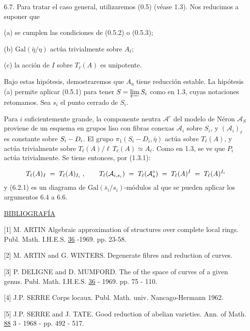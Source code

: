 6.7. Para tratar el caso general, utilizaremos (0.5) (véase 1.3). Nos reducimos a suponer que



(a) se cumplen las condiciones de (0.5.2) o (0.5.3);

(b) $\mathrm{Gal}(\bar{\eta}/\eta)$ actúa trivialmente sobre $A_\ell$;

(c) la acción de $I$ sobre $T_\ell(A)$ es unipotente.

Bajo estas hipótesis, demostraremos que $A_\eta$ tiene reducción estable. La hipótesis (a) permite aplicar (0.5.1) para tener $S = \varprojlim S_i$ como en 1.3, cuyas notaciones retomamos. Sea $s_i$ el punto cerrado de $S_i$.

Para $i$ suficientemente grande, la componente neutra $\mathcal{A}^\circ$ del modelo de Néron $\mathcal{A}_S$ proviene de un esquema en grupos liso con fibras conexas $\mathcal{A}_i$ sobre $S_i$, y $(\mathcal{A}_i)_\ell$ es constante sobre $S_i - \sisi{D}{D_i}$. El grupo $\pi_1(S_i - D_i , \bar{\eta})$ actúa sobre $T_\ell(A)$, y actúa trivialmente sobre $T_\ell(A)/\ell\, T_\ell(A) \simeq A_\ell$. Como en 1.3, se ve que $P_i$ actúa trivialmente. Se tiene entonces, por (1.3.1):

\begin{equation*}
T_\ell(A)_I \;=\; T_\ell(A)_{I_i} \;,\qquad T_\ell(\mathcal{A}_{i,s_i}) \;=\; T_\ell(\mathcal{A}^\circ_s) \;=\; T_\ell(A)^I \;=\; \sisi{T_\ell(A^{I_i})}{T_\ell(A)^{I_i}}
\end{equation*}
y (6.2.1) es un diagrama de $\mathrm{Gal}(\bar{s}_i/s_i)$-módulos al que se pueden aplicar los argumentos 6.4 a 6.6.




\underline{BIBLIOGRAFÍA}

[1]	M. ARTIN	Algebraic approximation of structures over complete local rings. Publ. Math. I.H.E.S. \underline{36} -1969. pp. 23-58.

[2]	M. ARTIN and G. WINTERS. Degenerate fibres and reduction of curves.

[3]	P. DELIGNE and D. MUMFORD. The  of the space of curves of a given genus. Publ. Math. I.H.E.S. \underline{36} - 1969. pp. 75 - 110.

[4]	J.P. SERRE	Corps locaux. Publ. Math. univ. Nancago-Hermann 1962.

[5]	J.P. SERRE and J. TATE. Good reduction of abelian varieties. Ann. of Math. \underline{88} 3 - 1968 - pp. 492 - 517.
